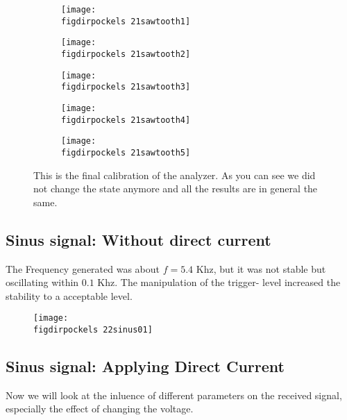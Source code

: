 \begin{figure}
    \begin{subfigure}[b]{\picwidth}
        \texttt{[image: \\figdirpockels 21sawtooth1]}
        \caption{}
    \end{subfigure}\qquad
    \begin{subfigure}[b]{\picwidth}
        \texttt{[image: \\figdirpockels 21sawtooth2]}
        \caption{}
    \end{subfigure}
    \begin{subfigure}[b]{\picwidth}
        \texttt{[image: \\figdirpockels 21sawtooth3]}
        \caption{}
    \end{subfigure}
    \begin{subfigure}[b]{\picwidth}
        \texttt{[image: \\figdirpockels 21sawtooth4]}
        \caption{}
    \end{subfigure}
    \begin{subfigure}[b]{\picwidth}
        \texttt{[image: \\figdirpockels 21sawtooth5]}
        \caption{}
    \end{subfigure}
    \caption{
        This is the final calibration of the analyzer. As you
        can see we did not change the state anymore and all the
        results are in general the same.
        }
    \label{fig:saw3}
\end{figure}
\flushleft
\clearpage
\subsection{Sinus signal: Without direct current}
The Frequency generated was about $f=5.4$ Khz, but it was not stable
but oscillating within $0.1$ Khz. The manipulation of the trigger-
level increased the stability to a acceptable level. 
\begin{figure}
\texttt{[image: \\figdirpockels 22sinus01]}
\end{figure}
\subsection{Sinus signal: Applying Direct Current}
Now we will look at the inluence of different parameters on
the received signal, especially the effect of changing the
voltage. 
